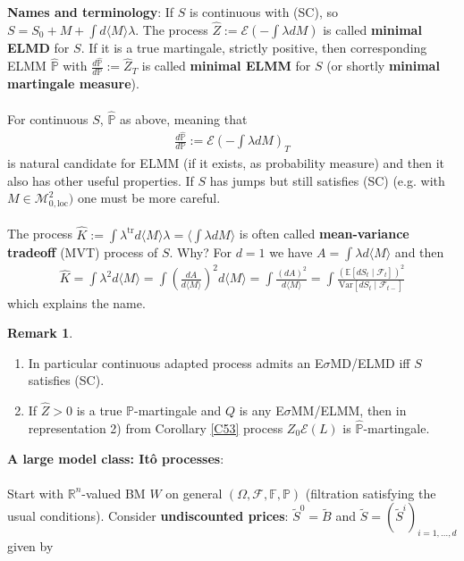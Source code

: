 \documentclass[12pt,a4paper, twoside]{article}
\theoremstyle{definition}
\newtheorem{rem}{Remark}[section]
\newcommand{\EE}{\mathbb{E}} %
\newcommand{\PP}{\mathbb{P}} %
\begin{document}
\newpage
\noindent \textbf{Names and terminology}: If $S$ is continuous with (SC), so $S= S_0 + M + \int d \langle M \rangle \lambda$. The process $\hat{Z}:= \mathcal{E}( - \int \lambda dM)$ is called \textbf{minimal ELMD} for $S$. If it is a true martingale, strictly positive, then corresponding ELMM $\hat{\PP}$ with $\frac{d\hat{\PP}}{d \PP} := \hat{Z}_T$ is called \textbf{minimal ELMM} for $S$ (or shortly \textbf{minimal martingale measure}).
\\\\
For continuous $S$, $\hat{\PP}$ as above, meaning that 
\begin{align*}
\frac{d\hat{\PP}}{d \PP}:= \mathcal{E} \left( - \int \lambda dM \right)_T
\end{align*}
is natural candidate for ELMM (if it exists, as probability measure) and then it also has other useful properties. If $S$ has jumps but still satisfies (SC) (e.g. with $M \in \mathcal{M}_{0, \text{loc}}^2)$ one must be more careful. 
\\\\
The process $\hat{K}:= \int \lambda^\text{tr} d \langle M \rangle \lambda = \langle \int \lambda dM \rangle$ is often called \textbf{mean-variance tradeoff} (MVT) process of $S$. Why? For $d=1$ we have $A= \int \lambda d \langle M \rangle$ and then
\begin{align*}
\hat{K}= \int \lambda^2 d \langle M \rangle = \int \left( \frac{dA}{d \langle M \rangle}\right)^2 d \langle M \rangle = \int \frac{(dA)^2}{d \langle M \rangle} = \int \frac{(\EE[dS_t \mid \mathcal{F}_t])^2}{\text{Var}[dS_t \mid \mathcal{F}_{t-}]}
\end{align*}
which explains the name. 
\begin{rem} \
\begin{enumerate}
\item In particular continuous adapted process admits an E$\sigma$MD/ELMD iff $S$ satisfies (SC).
\item If $\hat{Z}>0$ is a true $\PP$-martingale and $Q$ is any E$\sigma$MM/ELMM,  then in representation 2) from Corollary \ref{C53} process $Z_0 \mathcal{E}(L)$ is $\hat{\PP}$-martingale. 
\end{enumerate}
\end{rem}
\newpage
\noindent \textbf{A large model class: Itô processes}:
\\\\
Start with $\mathbb{R}^n$-valued BM $W$ on general $( \Omega, \mathcal{F}, \mathbb{F}, \PP)$ (filtration satisfying the usual conditions). Consider \textbf{undiscounted prices}: $\widetilde{S}^0 = \widetilde{B}$ and $\widetilde{S}=( \widetilde{S}^i)_{i=1, \dots , d}$ given by 
\end{document}
